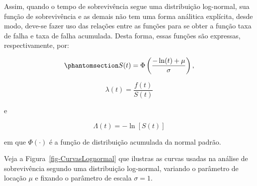 \documentclass[
  12pt,
  letterpaper,
  DIV=11,
  numbers=noendperiod]{scrreprt}
\begin{document}
Assim, quando o tempo de sobrevivência segue uma distribuição
log-normal, sua função de sobrevivência e as demais não tem uma forma
análitica explícita, desde modo, deve-se fazer uso das relações entre as
funções para se obter a função taxa de falha e taxa de falha acumulada.
Desta forma, essas funções são expressas, respectivamente, por:

\begin{equation}\phantomsection\label{eq-StLognormal}{
S (t) = \Phi \left( \dfrac{- \ln(t) + \mu}{\sigma} \right),
}\end{equation}

\[
\lambda (t) = \dfrac{f(t)}{S(t)}
\]

e

\[
\Lambda (t) = - \ln[S(t)]
\]

em que \(\Phi (\cdot)\) é a função de distribuição acumulada da normal
padrão.

Veja a Figura~\ref{fig-CurvasLognormal} que ilustras as curvas usadas na
análise de sobrevivência segundo uma distribuição log-normal, variando o
parâmetro de locação \(\mu\) e fixando o parâmetro de escala
\(\sigma = 1\).
\end{document}
